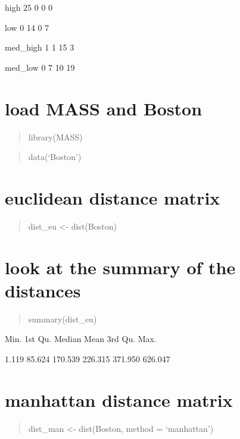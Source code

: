 \documentclass[]{article}
\begin{document}
high 25 0 0 0

low 0 14 0 7

med\_high 1 1 15 3

med\_low 0 7 10 19

\section{load MASS and Boston}\label{load-mass-and-boston}

\begin{quote}
library(MASS)
\end{quote}

\begin{quote}
data(`Boston')
\end{quote}

\begin{quote}
\end{quote}

\section{euclidean distance matrix}\label{euclidean-distance-matrix}

\begin{quote}
dist\_eu \textless{}- dist(Boston)
\end{quote}

\begin{quote}
\end{quote}

\section{look at the summary of the
distances}\label{look-at-the-summary-of-the-distances}

\begin{quote}
summary(dist\_eu)
\end{quote}

Min. 1st Qu. Median Mean 3rd Qu. Max.

1.119 85.624 170.539 226.315 371.950 626.047

\section{manhattan distance matrix}\label{manhattan-distance-matrix}

\begin{quote}
dist\_man \textless{}- dist(Boston, method = `manhattan')
\end{quote}
\end{document}
